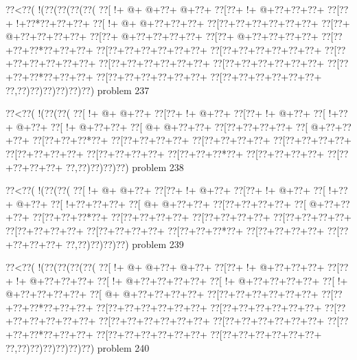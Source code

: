 \vbox{\vbox{\goo
\0??<\0??(\- !(\0??(\0??(\0??(\0??(
\0??[\- !+\- @+\- @+\0??+\- @+\0??+
\0??[\0??+\- !+\- @+\0??+\0??+\0??+
\0??[\0??+\- !+\0??*\0??+\0??+\0??+
\0??[\- !+\- @+\- @+\0??+\0??+\0??+
\0??[\0??+\0??+\0??+\0??+\0??+\0??+
\0??[\0??+\- @+\0??+\0??+\0??+\0??+
\0??[\0??+\- @+\0??+\0??+\0??+\0??+
\0??[\0??+\- @+\0??+\0??+\0??+\0??+
\0??[\0??+\0??+\0??*\0??+\0??+\0??+
\0??[\0??+\0??+\0??+\0??+\0??+\0??+
\0??[\0??+\0??+\0??+\0??+\0??+\0??+
\0??[\0??+\0??+\0??+\0??+\0??+\0??+
\0??[\0??+\0??+\0??+\0??+\0??+\0??+
\0??[\0??+\0??+\0??+\0??+\0??+\0??+
\0??[\0??+\0??+\0??*\0??+\0??+\0??+
\0??[\0??+\0??+\0??+\0??+\0??+\0??+
\0??[\0??+\0??+\0??+\0??+\0??+\0??+
\0??,\0??)\0??)\0??)\0??)\0??)\0??)
}
\hfil problem 237\hfil\break
}

\vbox{\vbox{\goo
\0??<\0??(\- !(\0??(\0??(
\0??[\- !+\- @+\- @+\0??+
\0??[\0??+\- !+\- @+\0??+
\0??[\0??+\- !+\- @+\0??+
\0??[\- !+\0??+\- @+\0??+
\0??[\- !+\- @+\0??+\0??+
\0??[\- @+\- @+\0??+\0??+
\0??[\0??+\0??+\0??+\0??+
\0??[\- @+\0??+\0??+\0??+
\0??[\0??+\0??+\0??*\0??+
\0??[\0??+\0??+\0??+\0??+
\0??[\0??+\0??+\0??+\0??+
\0??[\0??+\0??+\0??+\0??+
\0??[\0??+\0??+\0??+\0??+
\0??[\0??+\0??+\0??+\0??+
\0??[\0??+\0??+\0??*\0??+
\0??[\0??+\0??+\0??+\0??+
\0??[\0??+\0??+\0??+\0??+
\0??,\0??)\0??)\0??)\0??)
}
\hfil problem 238\hfil\break
}

\vbox{\vbox{\goo
\0??<\0??(\- !(\0??(\0??(
\0??[\- !+\- @+\- @+\0??+
\0??[\0??+\- !+\- @+\0??+
\0??[\0??+\- !+\- @+\0??+
\0??[\- !+\0??+\- @+\0??+
\0??[\- !+\0??+\0??+\0??+
\0??[\- @+\- @+\0??+\0??+
\0??[\0??+\0??+\0??+\0??+
\0??[\- @+\0??+\0??+\0??+
\0??[\0??+\0??+\0??*\0??+
\0??[\0??+\0??+\0??+\0??+
\0??[\0??+\0??+\0??+\0??+
\0??[\0??+\0??+\0??+\0??+
\0??[\0??+\0??+\0??+\0??+
\0??[\0??+\0??+\0??+\0??+
\0??[\0??+\0??+\0??*\0??+
\0??[\0??+\0??+\0??+\0??+
\0??[\0??+\0??+\0??+\0??+
\0??,\0??)\0??)\0??)\0??)
}
\hfil problem 239\hfil\break
}

\vbox{\vbox{\goo
\0??<\0??(\- !(\0??(\0??(\0??(\0??(
\0??[\- !+\- @+\- @+\0??+\- @+\0??+
\0??[\0??+\- !+\- @+\0??+\0??+\0??+
\0??[\0??+\- !+\- @+\0??+\0??+\0??+
\0??[\- !+\- @+\0??+\0??+\0??+\0??+
\0??[\- !+\- @+\0??+\0??+\0??+\0??+
\0??[\- !+\- @+\0??+\0??+\0??+\0??+
\0??[\- @+\- @+\0??+\0??+\0??+\0??+
\0??[\0??+\0??+\0??+\0??+\0??+\0??+
\0??[\0??+\0??+\0??*\0??+\0??+\0??+
\0??[\0??+\0??+\0??+\0??+\0??+\0??+
\0??[\0??+\0??+\0??+\0??+\0??+\0??+
\0??[\0??+\0??+\0??+\0??+\0??+\0??+
\0??[\0??+\0??+\0??+\0??+\0??+\0??+
\0??[\0??+\0??+\0??+\0??+\0??+\0??+
\0??[\0??+\0??+\0??*\0??+\0??+\0??+
\0??[\0??+\0??+\0??+\0??+\0??+\0??+
\0??[\0??+\0??+\0??+\0??+\0??+\0??+
\0??,\0??)\0??)\0??)\0??)\0??)\0??)
}
\hfil problem 240\hfil\break
}

